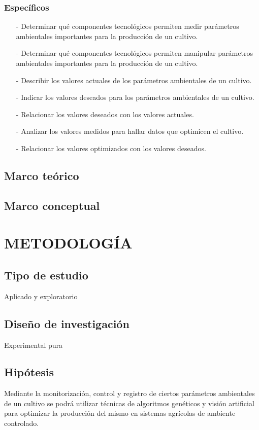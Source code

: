 \documentclass{report}
\begin{document}
\subsection{Específicos}
\begin{enumerate}
\item[-] Determinar qué componentes tecnológicos permiten medir parámetros
  ambientales importantes para la producción de un cultivo.
\item[-] Determinar qué componentes tecnológicos permiten manipular parámetros
  ambientales importantes para la producción de un cultivo.
\item[-] Describir los valores actuales de los parámetros ambientales de un
  cultivo.
\item[-] Indicar los valores deseados para los parámetros ambientales de un
  cultivo.
\item[-] Relacionar los valores deseados con los valores actuales.
\item[-] Analizar los valores medidos para hallar datos que optimicen el cultivo.
\item[-] Relacionar los valores optimizados con los valores deseados.
\end{enumerate}
\section{Marco teórico}
\section{Marco conceptual}

\chapter{METODOLOGÍA}
\section{Tipo de estudio}
Aplicado y exploratorio
\section{Diseño de investigación}
Experimental pura
\section{Hipótesis}
Mediante la monitorización, control y registro de ciertos parámetros ambientales
de un cultivo se podrá utilizar técnicas de algoritmos genéticos y visión
artificial para optimizar la producción del mismo en sistemas agrícolas de
ambiente controlado.
\end{document}

